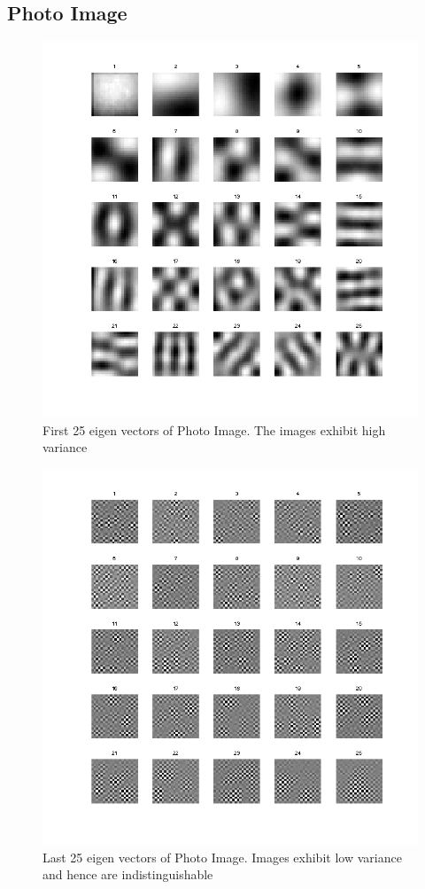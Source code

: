 \documentclass[12pt,english]{article}
\begin{document}
\subsection{Photo Image}
\begin{figure}
    \includegraphics[width=\linewidth]{first25-Photo-Images.png}
    \caption{First 25 eigen vectors of Photo Image. The images exhibit high variance}
\end{figure}

\begin{figure}
    \includegraphics[width=\linewidth]{last25-Photo-Images.png}
    \caption{Last 25 eigen vectors of Photo Image. Images exhibit low variance and hence are indistinguishable}
\end{figure}
\end{document}
